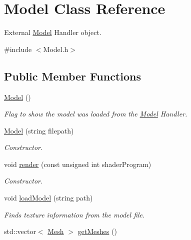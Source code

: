 \hypertarget{class_model}{\section{Model Class Reference}
\label{class_model}
}


External \hyperlink{class_model}{Model} Handler object.  




{\ttfamily \#include $<$Model.\+h$>$}

\subsection*{Public Member Functions}
\begin{DoxyCompactItemize}
\item 
\hypertarget{class_model_ae3b375de5f6df4faf74a95d64748e048}{\hyperlink{class_model_ae3b375de5f6df4faf74a95d64748e048}{Model} ()}\label{class_model_ae3b375de5f6df4faf74a95d64748e048}

\begin{DoxyCompactList}\small\item\em Flag to show the model was loaded from the \hyperlink{class_model}{Model} Handler. \end{DoxyCompactList}\item 
\hypertarget{class_model_a4a90abd11a1c4e47f1b704e28e147dfb}{\hyperlink{class_model_a4a90abd11a1c4e47f1b704e28e147dfb}{Model} (string filepath)}\label{class_model_a4a90abd11a1c4e47f1b704e28e147dfb}

\begin{DoxyCompactList}\small\item\em Constructor. \end{DoxyCompactList}\item 
\hypertarget{class_model_a0885da76930d0f3b919eaa10ae08e8ab}{void \hyperlink{class_model_a0885da76930d0f3b919eaa10ae08e8ab}{render} (const unsigned int shader\+Program)}\label{class_model_a0885da76930d0f3b919eaa10ae08e8ab}

\begin{DoxyCompactList}\small\item\em Constructor. \end{DoxyCompactList}\item 
\hypertarget{class_model_a293cf3e4b03935164fbee0fab62c78cd}{void \hyperlink{class_model_a293cf3e4b03935164fbee0fab62c78cd}{load\+Model} (string path)}\label{class_model_a293cf3e4b03935164fbee0fab62c78cd}

\begin{DoxyCompactList}\small\item\em Finds texture information from the model file. \end{DoxyCompactList}\item 
\hypertarget{class_model_a12c9acf4e5cf6150de113251148b98f8}{std\+::vector$<$ \hyperlink{class_mesh}{Mesh} $>$ \hyperlink{class_model_a12c9acf4e5cf6150de113251148b98f8}{get\+Meshes} ()}\label{class_model_a12c9acf4e5cf6150de113251148b98f8}


\end{DoxyCompactItemize}
